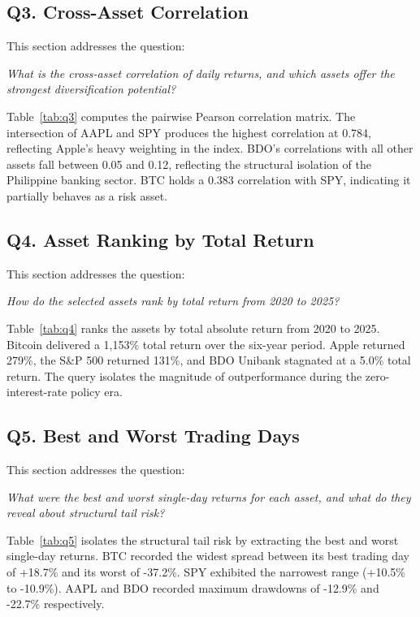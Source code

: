 \subsection{Q3. Cross-Asset Correlation}

This section addresses the question:

\noindent\textit{What is the cross-asset correlation of daily returns, and which assets offer the strongest diversification potential?}



Table~\ref{tab:q3} computes the pairwise Pearson correlation matrix. The intersection of AAPL and SPY produces the highest correlation at 0.784, reflecting Apple's heavy weighting in the index. BDO's correlations with all other assets fall between 0.05 and 0.12, reflecting the structural isolation of the Philippine banking sector. BTC holds a 0.383 correlation with SPY, indicating it partially behaves as a risk asset.

\subsection{Q4. Asset Ranking by Total Return}

This section addresses the question:

\noindent\textit{How do the selected assets rank by total return from 2020 to 2025?}



Table~\ref{tab:q4} ranks the assets by total absolute return from 2020 to 2025. Bitcoin delivered a 1,153\% total return over the six-year period. Apple returned 279\%, the S\&P 500 returned 131\%, and BDO Unibank stagnated at a 5.0\% total return. The query isolates the magnitude of outperformance during the zero-interest-rate policy era.

\subsection{Q5. Best and Worst Trading Days}

This section addresses the question:

\noindent\textit{What were the best and worst single-day returns for each asset, and what do they reveal about structural tail risk?}



Table~\ref{tab:q5} isolates the structural tail risk by extracting the best and worst single-day returns. BTC recorded the widest spread between its best trading day of +18.7\% and its worst of -37.2\%. SPY exhibited the narrowest range (+10.5\% to -10.9\%). AAPL and BDO recorded maximum drawdowns of -12.9\% and -22.7\% respectively.

